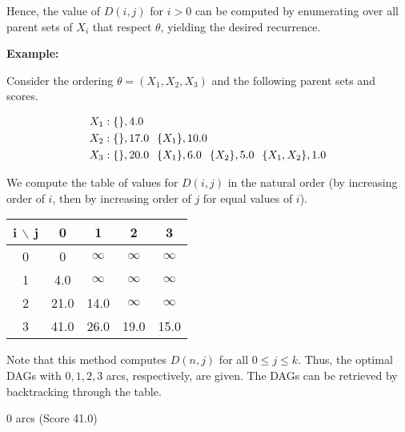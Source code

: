 \documentclass[twoside,11pt]{article}
\begin{document}
\bigskip
Hence, the value of $D(i, j)$ for $i > 0$ can be computed by enumerating over all parent sets of $X_i$ that respect $\theta$, yielding the desired recurrence. 

\bigskip
\textbf{Example:}

\bigskip
Consider the ordering $\theta = (X_1, X_2, X_3)$ and the following parent sets and scores.

\begin{align*}
X_1&: \{\}, 4.0\\
X_2&: \{\}, 17.0 \hspace{2.5mm} \{X_1\}, 10.0\\
X_3&: \{\}, 20.0 \hspace{2.5mm} \{X_1\}, 6.0 \hspace{2.5mm} \{X_2\}, 5.0  \hspace{2.5mm} \{X_1, X_2\}, 1.0
\end{align*}

\bigskip
We compute the table of values for $D(i, j)$ in the natural order (by increasing order of $i$, then by increasing order of $j$ for equal values of $i$). 

\begin{center}
    \begin{tabular}{ | c | c | c | c | c |}
    \hline
    i $\backslash$ j& 0 & 1 & 2 & 3 \\ \hline
    0 & 0 & $\infty$ & $\infty$ & $\infty$ \\ \hline
    1 & 4.0 & $\infty$ & $\infty$ & $\infty$ \\ \hline
    2 & 21.0 & 14.0 & $\infty$ & $\infty$ \\ \hline
    3 & 41.0 & 26.0 & 19.0 & 15.0 \\ \hline
    \end{tabular}
\end{center}

Note that this method computes $D(n, j)$ for all $0 \le j \le k$. Thus, the optimal DAGs with $0, 1, 2, 3$ arcs, respectively, are given. The DAGs can be retrieved by backtracking through the table.

$0$ arcs (Score 41.0)
\bigskip

    
\end{document}
